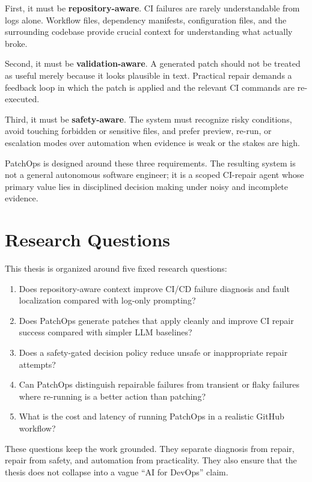 First, it must be \textbf{repository-aware}. CI failures are rarely understandable from logs alone. Workflow
files, dependency manifests, configuration files, and the surrounding codebase provide crucial context for
understanding what actually broke.

Second, it must be \textbf{validation-aware}. A generated patch should not be treated as useful merely because
it looks plausible in text. Practical repair demands a feedback loop in which the patch is applied and the
relevant CI commands are re-executed.

Third, it must be \textbf{safety-aware}. The system must recognize risky conditions, avoid touching forbidden or
sensitive files, and prefer preview, re-run, or escalation modes over automation when evidence is weak or the
stakes are high.

PatchOps is designed around these three requirements. The resulting system is not a general autonomous software
engineer; it is a scoped CI-repair agent whose primary value lies in disciplined decision making under noisy and
incomplete evidence.

\section{Research Questions}

This thesis is organized around five fixed research questions:

\begin{enumerate}
\item Does repository-aware context improve CI/CD failure diagnosis and fault localization compared with log-only
prompting?
\item Does PatchOps generate patches that apply cleanly and improve CI repair success compared with simpler LLM
baselines?
\item Does a safety-gated decision policy reduce unsafe or inappropriate repair attempts?
\item Can PatchOps distinguish repairable failures from transient or flaky failures where re-running is a better
action than patching?
\item What is the cost and latency of running PatchOps in a realistic GitHub workflow?
\end{enumerate}

These questions keep the work grounded. They separate diagnosis from repair, repair from safety, and automation
from practicality. They also ensure that the thesis does not collapse into a vague ``AI for DevOps'' claim.

